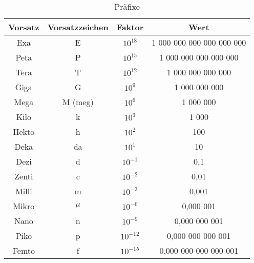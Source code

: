 \setlength{\tabcolsep}{4pt} %
\renewcommand{\arraystretch}{1.5} %
\begin{table}[!htb]
    \centering
    \begin{tabular}{|c|c|c|c|}
        \hline
        \textbf{Vorsatz} & \textbf{Vorsatzzeichen}        & \textbf{Faktor} & \textbf{Wert} \\ \hline
        Exa                & E                    & $10^{18}$           & 1 000 000 000 000 000 000  \\
        Peta               & P                    & $10^{15}$           & 1 000 000 000 000 000      \\
        Tera               & T                    & $10^{12}$           & 1 000 000 000 000          \\
        Giga               & G                    & $10^{9}$            & 1 000 000 000              \\
        Mega               & M (meg)              & $10^{6}$            & 1 000 000                  \\
        Kilo               & k                    & $10^{3}$            & 1 000                      \\
        Hekto              & h                    & $10^{2}$            & 100                        \\
        Deka               & da                   & $10^{1}$            & 10                         \\
        Dezi               & d                    & $10^{-1}$           & 0,1                        \\ 
        Zenti              & c                    & $10^{-2}$           & 0,01                       \\
        Milli              & m                    & $10^{-3}$           & 0,001                      \\
        Mikro              & $\mu$                & $10^{-6}$           & 0,000 001                  \\ 
        Nano               & n                    & $10^{-9}$           & 0,000 000 001              \\
        Piko               & p                    & $10^{-12}$          & 0,000 000 000 001          \\
        Femto              & f                    & $10^{-15}$          & 0,000 000 000 000 001      \\
        \hline

        \hline
    \end{tabular}
    \caption{Präfixe}
\end{table}